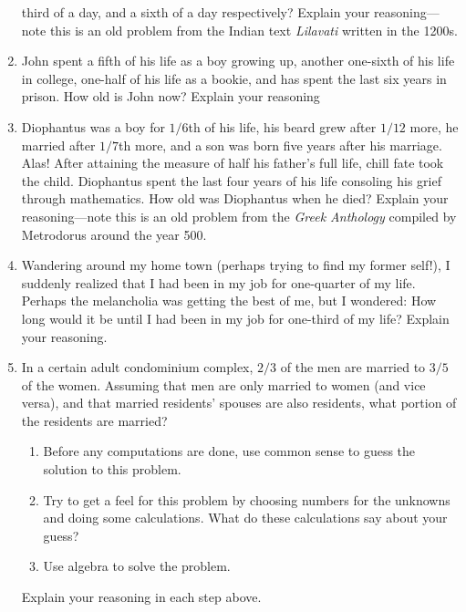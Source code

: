 \begin{problems}
\begin{enumerate}
  third of a day, and a sixth of a day respectively? Explain your
  reasoning---note this is an old problem from the Indian text
  \textit{Lilavati} written in the 1200s.
\item John spent a fifth of his life as a boy growing up, another
  one-sixth of his life in college, one-half of his life as a bookie,
  and has spent the last six years in prison. How old is John now?
  Explain your reasoning
\item Diophantus was a boy for $1/6$th of his life, his beard grew
  after $1/12$ more, he married after $1/7$th more, and a son was born
  five years after his marriage. Alas! After attaining the measure of
  half his father's full life, chill fate took the child. Diophantus
  spent the last four years of his life consoling his grief through
  mathematics. How old was Diophantus when he died?  Explain your
  reasoning---note this is an old problem from the \textit{Greek
    Anthology} compiled by Metrodorus around the year 500.
\item Wandering around my home town (perhaps trying to find my former
  self!), I suddenly realized that I had been in my job for
  one-quarter of my life. Perhaps the melancholia was getting the best
  of me, but I wondered: How long would it be until I had been in my
  job for one-third of my life? Explain your reasoning.
\item In a certain adult condominium complex, $2/3$ of the men are
  married to $3/5$ of the women. Assuming that men are only married to
  women (and vice versa), and that married residents' spouses are also
  residents, what portion of the residents are married? 
\begin{enumerate}
\item Before any computations are done, use common sense to guess the
  solution to this problem.
\item Try to get a feel for this problem by choosing numbers for the
  unknowns and doing some calculations. What do these calculations say
  about your guess?
\item Use algebra to solve the problem.
\end{enumerate}
Explain your reasoning in each step above.


\end{enumerate}
\end{problems}
